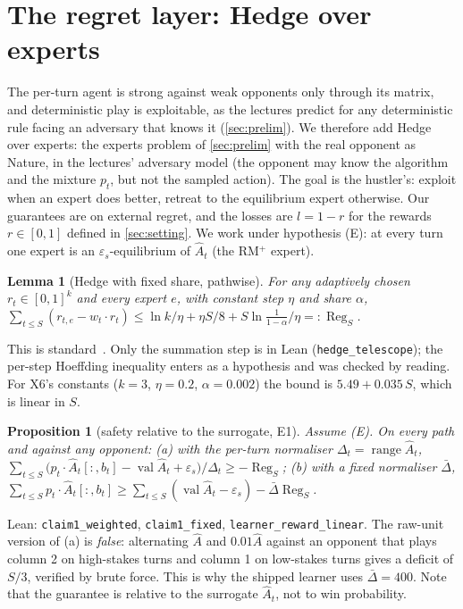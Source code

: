 \documentclass[10pt]{article}
\theoremstyle{plain}
\newtheorem{lemma}[theorem]{Lemma}
\newtheorem{proposition}[theorem]{Proposition}
\theoremstyle{definition}
\theoremstyle{remark}
\newcommand{\epss}{\varepsilon_s}
\newcommand{\Ahat}{\hat A}
\newcommand{\Dbar}{\bar\Delta}
\DeclareMathOperator{\val}{val}
\DeclareMathOperator{\Reg}{Reg}
\DeclareMathOperator{\range}{range}
\begin{document}
\section{The regret layer: Hedge over experts}
\label{sec:regret}
The per-turn agent is strong against weak opponents only through its matrix, and deterministic play is exploitable, as the lectures predict for any deterministic rule facing an adversary that knows it (\cref{sec:prelim}). We therefore add Hedge over experts: the experts problem of \cref{sec:prelim} with the real opponent as Nature, in the lectures' adversary model (the opponent may know the algorithm and the mixture $p_t$, but not the sampled action). The goal is the hustler's: exploit when an expert does better, retreat to the equilibrium expert otherwise. Our guarantees are on external regret, and the losses are $l=1-r$ for the rewards $r\in[0,1]$ defined in \cref{sec:setting}. We work under hypothesis (E): at every turn one expert is an $\epss$-equilibrium of $\Ahat_t$ (the RM$^+$ expert).

\begin{lemma}[Hedge with fixed share, pathwise]\label{lem:H}
For any adaptively chosen $r_t\in[0,1]^k$ and every expert $e$, with constant step $\eta$ and share $\alpha$,
$\sum_{t\le S}(r_{t,e}-w_t\cdot r_t)\le\ln k/\eta+\eta S/8+S\ln\tfrac1{1-\alpha}/\eta=:\Reg_S$.
\end{lemma}
This is standard~\cite{FS97,HW98,CBL06}. Only the summation step is in Lean (\texttt{hedge\_telescope}); the per-step Hoeffding inequality enters as a hypothesis and was checked by reading. For X6's constants ($k=3$, $\eta=0.2$, $\alpha=0.002$) the bound is $5.49+0.035\,S$, which is linear in $S$.

\begin{proposition}[safety relative to the surrogate, E1]\label{prop:E1}
Assume (E). On every path and against any opponent:
(a) with the per-turn normaliser $\Delta_t=\range\Ahat_t$, $\sum_{t\le S}\big(p_t\cdot\Ahat_t[:,b_t]-\val\Ahat_t+\epss\big)/\Delta_t\ge-\Reg_S$;
(b) with a fixed normaliser $\Dbar$, $\sum_{t\le S}p_t\cdot\Ahat_t[:,b_t]\ge\sum_{t\le S}(\val\Ahat_t-\epss)-\Dbar\Reg_S$.
\end{proposition}
Lean: \texttt{claim1\_weighted}, \texttt{claim1\_fixed}, \texttt{learner\_reward\_linear}. The raw-unit version of (a) is \emph{false}: alternating $\Ahat$ and $0.01\Ahat$ against an opponent that plays column 2 on high-stakes turns and column 1 on low-stakes turns gives a deficit of $S/3$, verified by brute force. This is why the shipped learner uses $\Dbar=400$. Note that the guarantee is relative to the surrogate $\Ahat_t$, not to win probability.
\end{document}
